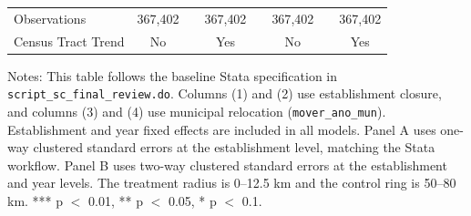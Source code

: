 \begin{table}[htb]
{\begin{threeparttable}
\begin{tabular}{lccccccc}
    \midrule
    Observations & 367{,}402 &  & 367{,}402 &  & 367{,}402 &  & 367{,}402\\
    Census Tract Trend & No &  & Yes &  & No &  & Yes\\
    \bottomrule
    \end{tabular}%
    \begin{tablenotes}[flushleft]
    \item \small Notes: This table follows the baseline Stata specification in \texttt{script\_sc\_final\_review.do}. Columns (1) and (2) use establishment closure, and columns (3) and (4) use municipal relocation (\texttt{mover\_ano\_mun}). Establishment and year fixed effects are included in all models. Panel A uses one-way clustered standard errors at the establishment level, matching the Stata workflow. Panel B uses two-way clustered standard errors at the establishment and year levels. The treatment radius is 0--12.5 km and the control ring is 50--80 km. *** p $<$ 0.01, ** p $<$ 0.05, * p $<$ 0.1.
    \end{tablenotes}
  \end{threeparttable}
  }
\end{table}%
